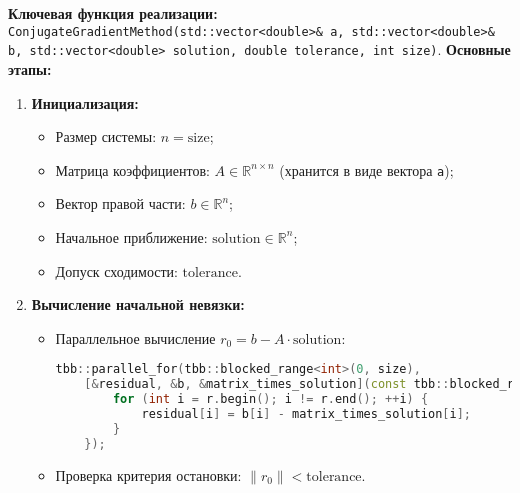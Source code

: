 \documentclass[12pt]{article}
\begin{document}
\textbf{Ключевая функция реализации:} \texttt{ConjugateGradientMethod(std::vector<double>\& a, std::vector<double>\& b, std::vector<double> solution, double tolerance, int size)}.
\textbf{Основные этапы:}
\begin{enumerate}
  \item \textbf{Инициализация:}
  \begin{itemize}
    \item Размер системы: $n = \text{size}$;
    \item Матрица коэффициентов: $A \in \mathbb{R}^{n \times n}$ (хранится в виде вектора \texttt{a});
    \item Вектор правой части: $b \in \mathbb{R}^n$;
    \item Начальное приближение: $\text{solution} \in \mathbb{R}^n$;
    \item Допуск сходимости: $\text{tolerance}$.
  \end{itemize}

  \item \textbf{Вычисление начальной невязки:}
  \begin{itemize}
    \item Параллельное вычисление $r_0 = b - A \cdot \text{solution}$:
\begin{lstlisting}[language=C++]
tbb::parallel_for(tbb::blocked_range<int>(0, size),
    [&residual, &b, &matrix_times_solution](const tbb::blocked_range<int>& r) {
        for (int i = r.begin(); i != r.end(); ++i) {
            residual[i] = b[i] - matrix_times_solution[i];
        }
    });
\end{lstlisting}
    \item Проверка критерия остановки: $\|r_0\| < \text{tolerance}$.
  \end{itemize}


\end{enumerate}
\end{document}
